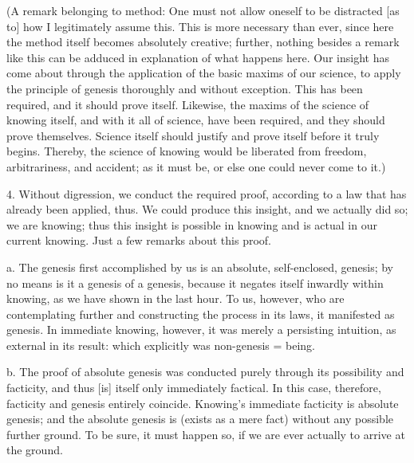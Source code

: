 (A remark belonging to method:
One must not allow oneself to be distracted
[as to] how I legitimately assume this.
This is more necessary than ever,
since here the method itself becomes absolutely creative;
further, nothing besides a remark like this
can be adduced in explanation of what happens here.
Our insight has come about through
the application of the basic maxims of our science,
to apply the principle of genesis
thoroughly and without exception.
This has been required,
and it should prove itself.
Likewise, the maxims of the science of knowing itself,
and with it all of science, have been required,
and they should prove themselves.
Science itself should justify
and prove itself before it truly begins.
Thereby, the science of knowing would be liberated
from freedom, arbitrariness, and accident;
as it must be, or else one could never come to it.)

4. Without digression, we conduct the required proof,
according to a law that has already been applied, thus.
We could produce this insight,
and we actually did so; we are knowing;
thus this insight is possible in knowing
and is actual in our current knowing.
Just a few remarks about this proof.

a. The genesis first accomplished by us is
an absolute, self-enclosed, genesis;
by no means is it a genesis of a genesis,
because it negates itself inwardly within knowing,
as we have shown in the last hour.
To us, however, who are contemplating further
and constructing the process in its laws,
it manifested as genesis.
In immediate knowing, however,
it was merely a persisting intuition,
as external in its result:
which explicitly was non-genesis = being.

b. The proof of absolute genesis was conducted purely
through its possibility and facticity,
and thus [is] itself only immediately factical.
In this case, therefore, facticity and genesis entirely coincide.
Knowing's immediate facticity is absolute genesis;
and the absolute genesis is (exists as a mere fact)
without any possible further ground.
To be sure, it must happen so,
if we are ever actually to arrive at the ground.

